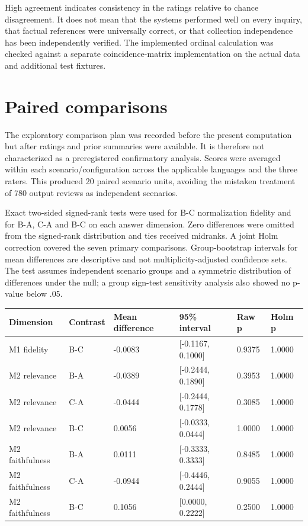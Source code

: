 High agreement indicates consistency in the ratings relative to chance disagreement. It does not mean that the systems performed well on every inquiry, that factual references were universally correct, or that collection independence has been independently verified. The implemented ordinal calculation was checked against a separate coincidence-matrix implementation on the actual data and additional test fixtures.


\section{Paired comparisons}

The exploratory comparison plan was recorded before the present computation but after ratings and prior summaries were available. It is therefore not characterized as a preregistered confirmatory analysis. Scores were averaged within each scenario/configuration across the applicable languages and the three raters. This produced 20 paired scenario units, avoiding the mistaken treatment of 780 output reviews as independent scenarios.


Exact two-sided signed-rank tests were used for B-C normalization fidelity and for B-A, C-A and B-C on each answer dimension. Zero differences were omitted from the signed-rank distribution and ties received midranks. A joint Holm correction covered the seven primary comparisons. Group-bootstrap intervals for mean differences are descriptive and not multiplicity-adjusted confidence sets. The test assumes independent scenario groups and a symmetric distribution of differences under the null; a group sign-test sensitivity analysis also showed no p-value below .05.


{\small\begin{longtable}{@{}p{0.95in}p{0.95in}p{0.95in}p{0.95in}p{0.95in}p{0.95in}@{}}\toprule

Dimension & Contrast & Mean difference & 95\% interval & Raw p & Holm p \\ \midrule\endhead

M1 fidelity & B-C & -0.0083 & [-0.1167, 0.1000] & 0.9375 & 1.0000 \\

M2 relevance & B-A & -0.0389 & [-0.2444, 0.1890] & 0.3953 & 1.0000 \\

M2 relevance & C-A & -0.0444 & [-0.2444, 0.1778] & 0.3085 & 1.0000 \\

M2 relevance & B-C & 0.0056 & [-0.0333, 0.0444] & 1.0000 & 1.0000 \\

M2 faithfulness & B-A & 0.0111 & [-0.3333, 0.3333] & 0.8485 & 1.0000 \\

M2 faithfulness & C-A & -0.0944 & [-0.4446, 0.2444] & 0.9055 & 1.0000 \\

M2 faithfulness & B-C & 0.1056 & [0.0000, 0.2222] & 0.2500 & 1.0000 \\

\bottomrule\end{longtable}}

